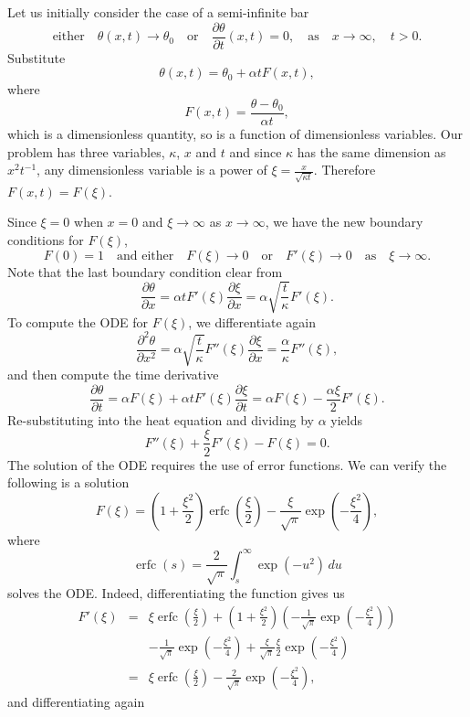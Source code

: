 \documentclass{article}
\newcommand{\pder}[2][]{\frac{\partial#1}{\partial#2}}
\newcommand{\spder}[2][]{\frac{\partial^2#1}{\partial#2^2}}
\begin{document}
Let us initially consider the case of a semi-infinite bar 
\[ \mbox{either} \quad \theta(x, t) \to \theta_0 \quad \mbox{or} \quad \pder[\theta]{t}(x,t) = 0, \quad \mbox{as} \quad x \to \infty, \quad t > 0. \]
Substitute
\[ \theta(x,t) = \theta_0 + \alpha tF(x,t), \]
where 
\[ F(x,t) = \frac{\theta - \theta_0}{\alpha t} ,\]
which is a dimensionless quantity, so is a function of dimensionless variables. Our problem has three variables, \(\kappa\), \(x\) and \(t\) and since \(\kappa\) has the same dimension as \(x^2 t^{-1}\), any dimensionless variable is a power of \(\xi = \frac{x}{\sqrt{\kappa t}}\). Therefore \(F(x,t) = F(\xi)\). 

Since \(\xi = 0\) when \(x = 0\) and \(\xi \to \infty\) as \(x \to \infty\), we have the new boundary conditions for \(F(\xi)\),
\[ F(0) = 1 \quad \mbox{and either} \quad F(\xi) \to 0  \quad \mbox{or} \quad F'(\xi) \to 0 \quad \mbox{as} \quad \xi \to \infty. \]
Note that the last boundary condition clear from
\[ \pder[\theta]{x} = \alpha t F'(\xi)\pder[\xi]{x} = \alpha \sqrt{\frac{t}{\kappa}}F'(\xi). \]
To compute the ODE for \(F(\xi)\), we differentiate again
\[ \spder[\theta]{x} = \alpha \sqrt{\frac{t}{\kappa}} F''(\xi) \pder[\xi]{x} = \frac{\alpha}{\kappa}F''(\xi), \]
and then compute the time derivative
\[ \pder[\theta]{t} = \alpha F(\xi) + \alpha t F'(\xi)\pder[\xi]{t} = \alpha F(\xi) - \frac{\alpha \xi}{2}F'(\xi). \]
Re-substituting into the heat equation and dividing by \(\alpha\) yields
\[ F''(\xi) + \frac{ \xi}{2}F'(\xi) - F(\xi) = 0. \]
The solution of the ODE requires the use of error functions. We can verify the following is a solution
\[ F(\xi) = \left(1 + \frac{\xi^2}{2}\right)\mathop{\mathrm{erfc}}\left(\frac{\xi}{2}\right) - \frac{\xi}{\sqrt{\pi}}\exp\left(-\frac{\xi^2}{4}\right), \]
where
\[ \mathop{\mathrm{erfc}}(s) = \frac{2}{\sqrt{\pi}}\int_s^\infty \exp(-u^2)\,du \]
solves the ODE. Indeed, differentiating the function gives us
\begin{eqnarray*}
    F'(\xi) & = & \xi \mathop{\mathrm{erfc}}\left(\frac{\xi}{2}\right) +  \left(1 + \frac{\xi^2}{2}\right)\left( -\frac{1}{\sqrt{\pi}}\exp\left(-\frac{\xi^2}{4}\right) \right) \\
            & & -\frac{1}{\sqrt{\pi}}\exp\left(-\frac{\xi^2}{4}\right) + \frac{\xi}{\sqrt{\pi}}\frac{\xi}{2}\exp\left(-\frac{\xi^2}{4}\right) \\
            & = & \xi \mathop{\mathrm{erfc}}\left(\frac{\xi}{2}\right) - \frac{2}{\sqrt{\pi}}\exp\left(-\frac{\xi^2}{4}\right),
\end{eqnarray*}
and differentiating again
\end{document}

